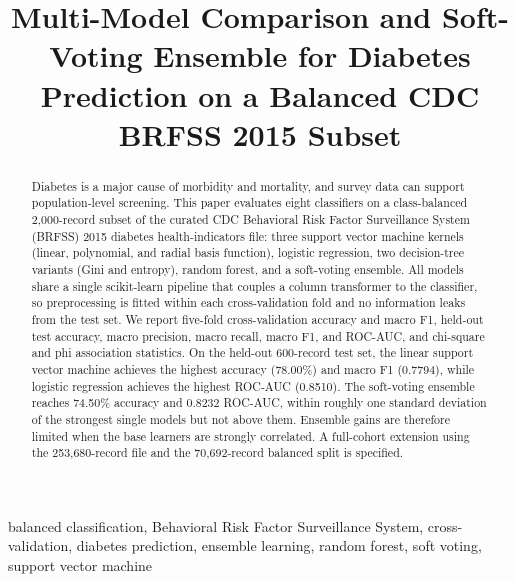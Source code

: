 \documentclass[conference]{IEEEtran}
\begin{document}
\title{Multi-Model Comparison and Soft-Voting Ensemble for Diabetes Prediction on a Balanced CDC BRFSS 2015 Subset}

\author{
}

\maketitle

\begin{abstract}
Diabetes is a major cause of morbidity and mortality, and survey data can support population-level screening. This paper evaluates eight classifiers on a class-balanced 2,000-record subset of the curated CDC Behavioral Risk Factor Surveillance System (BRFSS) 2015 diabetes health-indicators file: three support vector machine kernels (linear, polynomial, and radial basis function), logistic regression, two decision-tree variants (Gini and entropy), random forest, and a soft-voting ensemble. All models share a single scikit-learn pipeline that couples a column transformer to the classifier, so preprocessing is fitted within each cross-validation fold and no information leaks from the test set. We report five-fold cross-validation accuracy and macro F1, held-out test accuracy, macro precision, macro recall, macro F1, and ROC-AUC, and chi-square and phi association statistics. On the held-out 600-record test set, the linear support vector machine achieves the highest accuracy (78.00\%) and macro F1 (0.7794), while logistic regression achieves the highest ROC-AUC (0.8510). The soft-voting ensemble reaches 74.50\% accuracy and 0.8232 ROC-AUC, within roughly one standard deviation of the strongest single models but not above them. Ensemble gains are therefore limited when the base learners are strongly correlated. A full-cohort extension using the 253,680-record file and the 70,692-record balanced split is specified.
\end{abstract}

\begin{IEEEkeywords}
balanced classification, Behavioral Risk Factor Surveillance System, cross-validation, diabetes prediction, ensemble learning, random forest, soft voting, support vector machine
\end{IEEEkeywords}
\end{document}
